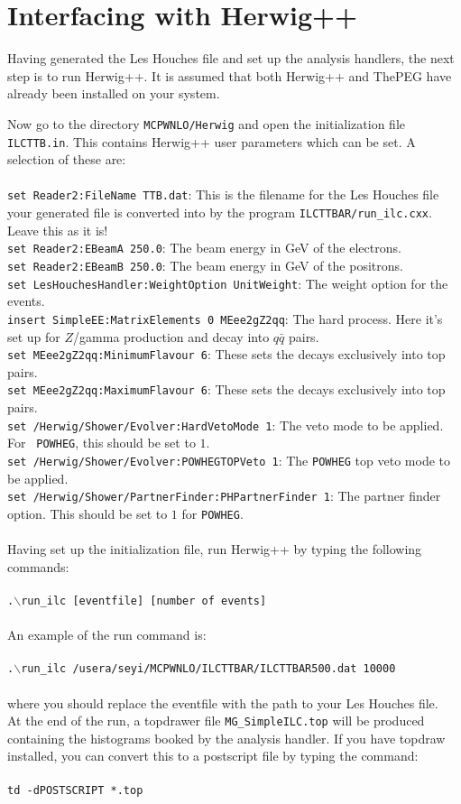 \documentclass[12pt,a4paper,oneside]{article}
\begin{document}
\section{Interfacing with \textsf{Herwig++}}
Having generated the Les Houches file and set up the analysis handlers, the next step is to
run \textsf{Herwig++}. It is assumed that both \textsf{Herwig++} and \textsf{ThePEG} have
already been installed on your system. 

Now go to the directory {\tt MCPWNLO/Herwig} and open the initialization file {\tt
  ILCTTB.in}. This contains \textsf{Herwig++} user parameters which can be set. A selection of
these are:\\
\\
{\tt set Reader2:FileName TTB.dat}: This is the filename for the Les Houches file your
generated file is converted into by the program {\tt ILCTTBAR/run\_ilc.cxx}. Leave this
as it is! \\
{\tt set Reader2:EBeamA 250.0}: The beam energy in GeV of the electrons. \\
{\tt set Reader2:EBeamB 250.0}: The beam energy in GeV of the positrons.\\
{\tt set LesHouchesHandler:WeightOption UnitWeight}: The weight option for the
events. \\
{\tt insert SimpleEE:MatrixElements 0 MEee2gZ2qq}: The hard process. Here it's set up for
$Z$/gamma production and decay into $q \bar{q}$ pairs.\\
{\tt set MEee2gZ2qq:MinimumFlavour 6}: These sets the decays exclusively into top pairs. \\
{\tt set MEee2gZ2qq:MaximumFlavour 6}: These sets the decays exclusively into top pairs. \\
{\tt set /Herwig/Shower/Evolver:HardVetoMode 1}: The veto mode to be applied. For {\tt
  POWHEG}, this should be set to $1$.\\
{\tt set /Herwig/Shower/Evolver:POWHEGTOPVeto 1}: The {\tt POWHEG} top veto mode to be
applied.\\
{\tt set /Herwig/Shower/PartnerFinder:PHPartnerFinder 1}: The partner finder option. This
should be set to $1$ for {\tt POWHEG}.\\
\\
Having set up the initialization file, run \textsf{Herwig++} by typing the following
commands: \\
\\
{\tt .$\backslash$run\_ilc [eventfile] [number of events]} \\
\\
An example of the run
command is:\\
\\
{\tt .$\backslash$run\_ilc /usera/seyi/MCPWNLO/ILCTTBAR/ILCTTBAR500.dat 10000}\\
\\
where you should replace the eventfile with the path to your Les Houches file.
\\
  At the end of the run, a topdrawer file {\tt MG\_SimpleILC.top}  will be
  produced containing the histograms booked by the analysis handler. If you have topdraw
  installed, you can convert this to a postscript file by typing the command:\\
\\
{\tt td -dPOSTSCRIPT  *.top}
\end{document}
